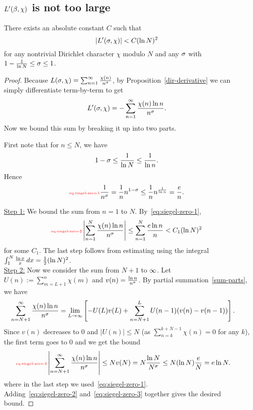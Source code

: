 \subsection{$L'(\beta,\chi)$ is not too large}
\begin{lem}
There exists an absolute constant $C$ such that 
\[
|L'(\sigma,\chi)|<C(\ln N)^2
\]
for any nontrivial Dirichlet character $\chi$ modulo $N$ and any $\sigma$ with $1-\frac{1}{\ln N}\le \sigma\le 1$.
\end{lem}
\begin{proof}
Because $L(\sigma,\chi)=\sum_{n=1}^{\infty} \frac{\chi(n)}{n^{\sigma}}$, by Proposition~\ref{dir-derivative} we can simply differentiate term-by-term to get
\[
L'(\sigma,\chi)=-\sum_{n=1}^{\infty} \frac{\chi(n)\ln n}{n^{\sigma}}.
\]
Now we bound this sum by breaking it up into two parts.

First note that for $n\le N$, we have 
\[1-\sigma\le \frac{1}{\ln N}\le \frac{1}{\ln n}.\]
Hence 
\begin{equation}\llabel{eq:siegel-zero-1}
\rc{n^{\si}}=\rc{n}n^{1-\si}\le \rc{n}n^{\rc{\ln n}}=\fc{e}{n}.
\end{equation}

\noindent\underline{Step 1:} We bound the sum from $n=1$ to $N$. 
By~\eqref{eq:siegel-zero-1},
\begin{equation}\llabel{eq:siegel-zero-2}
\ab{\sum_{n=1}^N \fc{\chi(n)\ln n}{n^{\si}}}\le \sum_{n=1}^N \fc{e\ln n}{n}<C_1(\ln N)^2
\end{equation}
for some $C_1$. The last step follows from estimating using the integral $\int_{1}^N \frac{\ln x}{x}\,dx=\frac{1}{2} (\ln N)^2$.\\

\noindent\underline{Step 2:} Now we consider the sum from $N+1$ to $\infty$. 
Let $U(n):=\sum_{m=L+1}^n\chi(m)$ and $v(n)=\frac{\ln n}{n^{\sigma}}$.
By partial summation~\ref{sum-parts}, we have
\begin{align*}
\sum_{n=N+1}^{\infty} \frac{\chi(n)\ln n}{n^{\sigma}}
&=\lim_{L\to \infty}\left[ {-U(L)v(L) +\sum_{n=N+1}^L U(n-1)(v(n)-v(n-1))} \right].
\end{align*}
Since $v(n)$ decreases to 0 and $|U(n)|\le N$ (as $\sum_{n=k}^{k+N-1}\chi(n)=0$ for any $k$), the first term goes to 0 and we get the bound
\begin{align}
\llabel{eq:siegel-zero-3}
\ab{\sum_{n=N+1}^{\iy} \fc{\chi(n)\ln n}{n^{\si}}}\le Nv(N)&=N\frac{\ln N}{N^{\si}}\le N(\ln N)\frac{e}{N}=e\ln N.
\end{align}
where in the last step we used~\eqref{eq:siegel-zero-1}.\\

Adding~\eqref{eq:siegel-zero-2} and~\eqref{eq:siegel-zero-3} together gives the desired bound.
\end{proof}
